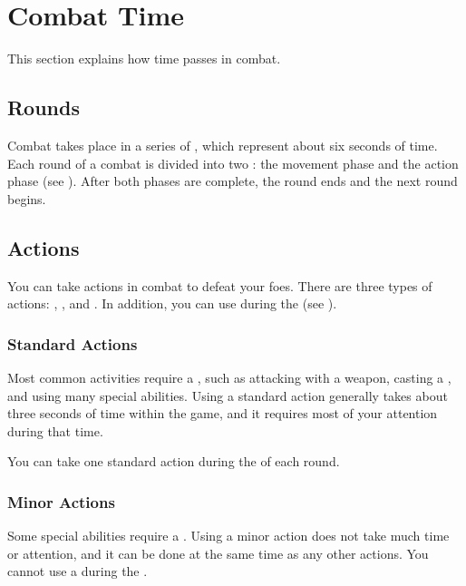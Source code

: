 \section{Combat Time}\label{Combat Time}
    This section explains how time passes in combat.

    \subsection{Rounds}\label{Rounds}

        Combat takes place in a series of , which represent about six seconds of time.
        Each round of a combat is divided into two : the movement phase and the action phase (see ).
        After both phases are complete, the round ends and the next round begins.

    \subsection{Actions}\label{Actions}

        You can take actions in combat to defeat your foes.
        There are three types of actions: , , and .
        In addition, you can use  during the  (see ).

        \subsubsection{Standard Actions}\label{Standard Actions}
            Most common activities require a , such as attacking with a weapon, casting a , and using many special abilities.
            Using a standard action generally takes about three seconds of time within the game, and it requires most of your attention during that time.

            You can take one standard action during the  of each round.

        \subsubsection{Minor Actions}\label{Minor Actions}
            Some special abilities require a .
            Using a minor action does not take much time or attention, and it can be done at the same time as any other actions.
            You cannot use a  during the .

